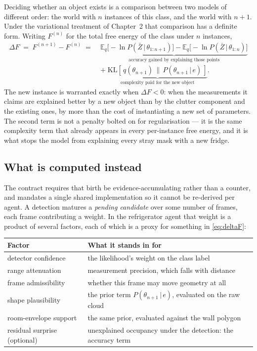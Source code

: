 \documentclass[11pt,a4paper]{report}
\newcommand{\given}{\,|\,}
\begin{document}
Deciding whether an object exists is a comparison between two models of different order: the world
with $n$ instances of this class, and the world with $n+1$. Under the variational treatment of
Chapter~2 that comparison has a definite form. Writing $F^{(n)}$ for the total free energy of the
class under $n$ instances,
\begin{align}
\Delta F \;=\; F^{(n+1)}-F^{(n)}
\;=\;&
\underbrace{\mathbb{E}_{q}\big[-\ln P(\bar Z\given\theta_{1:n+1})\big]
          -\mathbb{E}_{q}\big[-\ln P(\bar Z\given\theta_{1:n})\big]}_{\text{accuracy gained by explaining those points}}
\nonumber\\[4pt]
&+\;
\underbrace{\mathrm{KL}\!\left[\,q(\theta_{n+1})\,\|\,P(\theta_{n+1}\given e)\,\right]}_{\text{complexity paid for the new object}} .
\label{eq:deltaF}
\end{align}
The new instance is warranted exactly when $\Delta F<0$: when the measurements it claims are
explained better by a new object than by the clutter component and the existing ones, by more than
the cost of instantiating a new set of parameters. The second term is not a penalty bolted on for
regularisation --- it is the same complexity term that already appears in every per-instance free
energy, and it is what stops the model from explaining every stray mask with a new fridge.

\subsection{What is computed instead}

The contract requires that birth be evidence-accumulating rather than a counter, and mandates a
single shared implementation so it cannot be re-derived per agent. A detection matures a
\emph{pending candidate} over some number of frames, each frame contributing a weight. In the
refrigerator agent that weight is a product of several factors, each of which is a proxy for
something in \eqref{eq:deltaF}:

\begin{center}
\begin{tabular}{@{}l p{9.4cm}@{}}
\toprule
Factor & What it stands in for \\
\midrule
detector confidence & the likelihood's weight on the class label \\
range attenuation   & measurement precision, which falls with distance \\
frame admissibility & whether this frame may move geometry at all \\
shape plausibility  & the prior term $P(\theta_{n+1}\given e)$, evaluated on the raw cloud \\
room-envelope support & the same prior, evaluated against the wall polygon \\
residual surprise (optional) & unexplained occupancy under the detection: the accuracy term \\
\bottomrule
\end{tabular}
\end{center}
\end{document}
